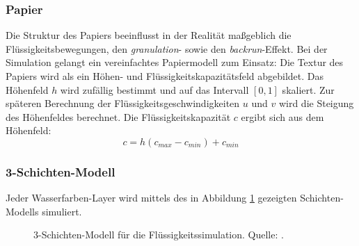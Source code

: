 \subsubsection{Papier}
Die Struktur des Papiers beeinflusst in der Realität maßgeblich die 
Flüssigkeitsbewegungen, den \textsl{granulation}- sowie den 
\textsl{backrun}-Effekt. Bei der Simulation gelangt ein vereinfachtes 
Papiermodell zum Einsatz: Die Textur des Papiers wird als ein Höhen- und 
Flüssigkeitskapazitätsfeld abgebildet. Das Höhenfeld $h$ wird zufällig bestimmt 
und auf das Intervall $[0,1]$ skaliert. Zur späteren Berechnung der 
Flüssigkeitsgeschwindigkeiten $u$ und $v$ wird die Steigung des Höhenfeldes 
berechnet. Die Flüssigkeitskapazität $c$ ergibt sich aus dem Höhenfeld:
\[
c = h (c_{max} - c_{min}) + c_{min}
\]

\subsubsection{3-Schichten-Modell}
Jeder Wasserfarben-Layer wird mittels des in Abbildung 
\ref{fig:3-schichten-modell} gezeigten Schichten-Modells simuliert.

\begin{figure}
  \centering
  \par
  \par
  \caption{3-Schichten-Modell für die Flüssigkeitssimulation. Quelle: \cite{Curtis1997}.}
  \label{fig:3-schichten-modell}
\end{figure}

